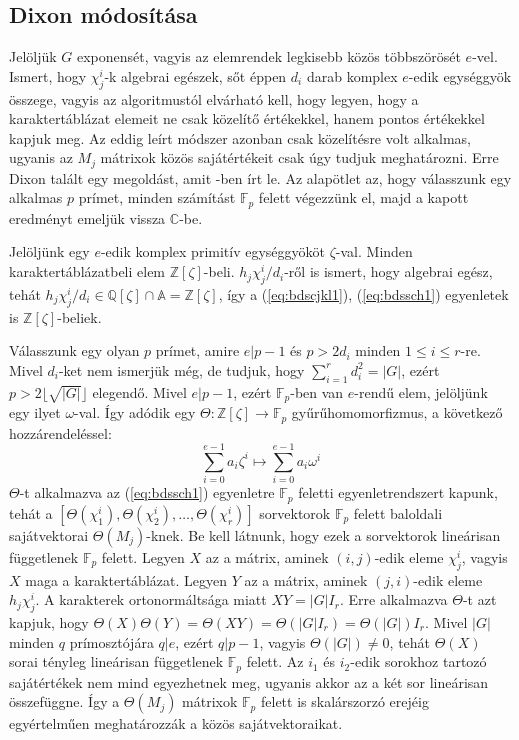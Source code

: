\subsection{Dixon módosítása}
\label{subsec:bdsdixon}
Jelöljük $G$ exponensét, vagyis az elemrendek legkisebb közös többszörösét $e$-vel.
Ismert, hogy $\chi^i_j$-k algebrai egészek, sőt éppen $d_i$ darab komplex $e$-edik egységgyök összege,
vagyis az algoritmustól elvárható kell, hogy legyen, hogy a karaktertáblázat elemeit ne csak közelítő értékekkel, hanem pontos értékekkel kapjuk meg.
Az eddig leírt módszer azonban csak közelítésre volt alkalmas, ugyanis az $M_j$ mátrixok közös sajátértékeit csak úgy tudjuk meghatározni.
Erre Dixon talált egy megoldást, amit \cite{Dix67}-ben írt le. Az alapötlet az, hogy válasszunk egy alkalmas $p$ prímet, minden számítást $\mathbb{F}_p$
felett végezzünk el, majd a kapott eredményt emeljük vissza $\mathbb{C}$-be.

Jelöljünk egy $e$-edik komplex primitív egységgyököt $\zeta$-val. Minden karaktertáblázatbeli elem $\mathbb{Z}[\zeta]$-beli.
$h_j\chi^i_j/d_i$-ről is ismert, hogy algebrai egész, tehát $h_j\chi^i_j/d_i \in \mathbb{Q}[\zeta] \cap \mathbb{A} = \mathbb{Z}[\zeta]$, így a
(\ref{eq:bdscjkl1}), (\ref{eq:bdssch1}) egyenletek is $\mathbb{Z}[\zeta]$-beliek.

Válasszunk egy olyan $p$ prímet, amire $e|p-1$ és $p > 2 d_i$ minden $1\le i\le r$-re. Mivel $d_i$-ket nem ismerjük még, de tudjuk, hogy 
$\sum_{i=1}^r d_i^2 = |G|$, ezért $p > 2\lfloor \sqrt{|G|} \rfloor$ elegendő. Mivel $e|p-1$, ezért $\mathbb{F}_p$-ben van $e$-rendű elem, jelöljünk
egy ilyet $\omega$-val. Így adódik egy $\Theta : \mathbb{Z}[\zeta] \to \mathbb{F}_p$ gyűrűhomomorfizmus, a következő hozzárendeléssel:
\begin{equation*}
\sum_{i=0}^{e-1} a_i \zeta^i \mapsto \sum_{i=0}^{e-1} a_i \omega^i
\end{equation*}
$\Theta$-t alkalmazva az (\ref{eq:bdssch1}) egyenletre $\mathbb{F}_p$ feletti egyenletrendszert kapunk,
tehát a $[\Theta(\chi^i_1), \Theta(\chi^i_2), \dots, \Theta(\chi^i_r)]$ sorvektorok $\mathbb{F}_p$ felett baloldali sajátvektorai $\Theta(M_j)$-knek.
Be kell látnunk, hogy ezek a sorvektorok lineárisan függetlenek $\mathbb{F}_p$ felett.
Legyen $X$ az a mátrix, aminek $(i, j)$-edik eleme $\chi^i_j$, vagyis $X$ maga a karaktertáblázat.
Legyen $Y$ az a mátrix, aminek $(j, i)$-edik eleme $h_j\chi^i_j$.
A karakterek ortonormáltsága miatt $XY=|G|I_r$.
Erre alkalmazva $\Theta$-t azt kapjuk, hogy $\Theta(X)\Theta(Y)=\Theta(XY)=\Theta(|G|I_r)=\Theta(|G|)I_r$.
Mivel $|G|$ minden $q$ prímosztójára $q|e$, ezért $q|p-1$, vagyis $\Theta(|G|)\ne 0$, tehát $\Theta(X)$ sorai tényleg lineárisan függetlenek $\mathbb{F}_p$ felett.
Az $i_1$ és $i_2$-edik sorokhoz tartozó sajátértékek nem mind egyezhetnek meg, ugyanis akkor az a két sor lineárisan összefüggne.
Így a $\Theta(M_j)$ mátrixok $\mathbb{F}_p$ felett is skalárszorzó erejéig egyértelműen meghatározzák a közös sajátvektoraikat.

